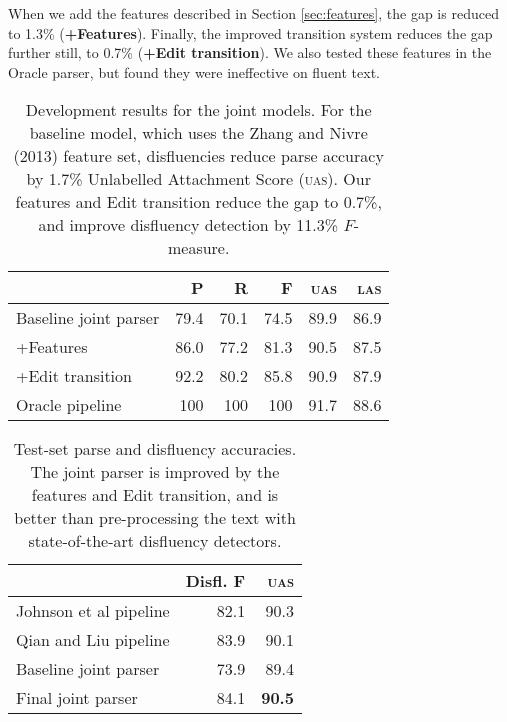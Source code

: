 \documentclass[11pt,letterpaper]{article}
\begin{document}
When we add the features described in Section \ref{sec:features}, the gap is reduced
to 1.3\% (\textbf{+Features}).  Finally, the improved transition system reduces
the gap further still, to 0.7\% (\textbf{+Edit transition}).  We also tested
these features in the Oracle parser, but found they were ineffective on fluent
text.


\begin{table}
    \centering
    \small
    \begin{tabular}{l|rrr|rr}
        & P & R & F & \textsc{uas} & \textsc{las} \\
        \hline \hline
Baseline joint parser &	79.4	&	70.1	&	74.5	&	89.9	&	86.9 \\
+Features &	86.0	&	77.2	&	81.3	&	90.5	&	87.5 \\ 
+Edit transition &	92.2	&	80.2	&	85.8	&	90.9	&	87.9 \\ 
\hline       
Oracle pipeline  & 100 & 100 & 100 & 91.7    & 88.6 \\
\hline
    \end{tabular}
    \caption{\small Development results for the joint models.  For the baseline model,
        which uses the Zhang and Nivre (2013) feature set,
        disfluencies reduce
        parse accuracy by 1.7\% Unlabelled Attachment Score (\textsc{uas}). 
        Our features and Edit transition reduce the gap to
        0.7\%, and improve disfluency detection by 11.3\% $F$-measure.
        \label{tab:dev}}
\end{table}


\begin{table}
    \small
    \centering
    \begin{tabular}{l|r|r}
        & Disfl. F & \textsc{uas} \\
        \hline \hline
Johnson et al pipeline      & 82.1 & 90.3 \\ 
Qian and Liu  pipeline     & 83.9 & 90.1  \\
\hline
Baseline joint parser & 73.9 & 89.4 \\
Final joint parser    & 84.1 & \textbf{90.5} \\
\hline
    \end{tabular}
    \caption{\small Test-set parse and disfluency accuracies.
             The joint parser is improved by the features and Edit transition,
             and is better than pre-processing the text with state-of-the-art
             disfluency detectors.
    \label{tab:test}}
\vspace*{-1.0ex}
\end{table}
\end{document}
